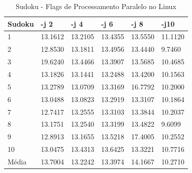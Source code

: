 \begin{table}[!ht]
\centering
\caption{Sudoku - Flags de Processamento Paralelo no Linux}
\label{tab:flag_processamento_paralelo:linux:sudoku}
\begin{tabular}{llllll}
\textbf{Sudoku} & \textbf{-j 2} & \textbf{-j 4} & \textbf{-j 6} & \textbf{-j 8} & \textbf{-j10}  \\ \toprule
1               & 13.1612 & 13.2105 & 13.4355 & 13.5550 & 11.1120  \\ 
2               & 12.8530 & 13.1811 & 13.4956 & 13.4440 & 9.7460   \\ 
3               & 19.6240 & 13.4466 & 13.3907 & 13.5685 & 10.4685  \\ 
4               & 13.1826 & 13.1441 & 13.2488 & 13.4200 & 10.1563  \\ 
5               & 13.2789 & 13.0709 & 13.3169 & 16.7792 & 10.2000  \\ 
6               & 13.0488 & 13.0823 & 13.2919 & 13.3107 & 10.1864  \\ 
7               & 12.7417 & 13.2555 & 13.3103 & 13.3844 & 10.2037  \\ 
8               & 13.1751 & 13.2540 & 13.3199 & 13.4822 & 9.6099   \\ 
9               & 12.8913 & 13.1655 & 13.5218 & 17.4005 & 10.2552  \\ 
10              & 13.0475 & 13.4313 & 13.6425 & 13.3221 & 10.7716  \\ \bottomrule
Média           & 13.7004 & 13.2242 & 13.3974 & 14.1667 & 10.2710  \\ 
\end{tabular}
\end{table}

